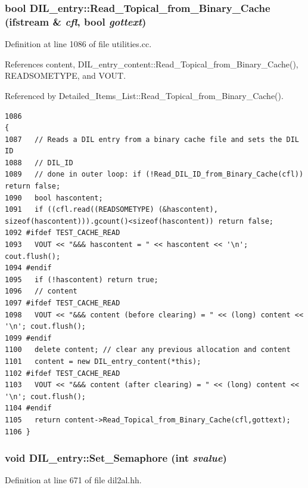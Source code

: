 \subsubsection{\setlength{\rightskip}{0pt plus 5cm}bool DIL\_\-entry::Read\_\-Topical\_\-from\_\-Binary\_\-Cache (ifstream \& {\em cfl}, bool {\em gottext})}\label{classDIL__entry_a25}




Definition at line 1086 of file utilities.cc.

References content, DIL\_\-entry\_\-content::Read\_\-Topical\_\-from\_\-Binary\_\-Cache(), READSOMETYPE, and VOUT.

Referenced by Detailed\_\-Items\_\-List::Read\_\-Topical\_\-from\_\-Binary\_\-Cache().



\footnotesize\begin{verbatim}1086                                                                            {
1087   // Reads a DIL entry from a binary cache file and sets the DIL ID
1088   // DIL_ID
1089   // done in outer loop: if (!Read_DIL_ID_from_Binary_Cache(cfl)) return false;
1090   bool hascontent;
1091   if ((cfl.read((READSOMETYPE) (&hascontent), sizeof(hascontent))).gcount()<sizeof(hascontent)) return false;
1092 #ifdef TEST_CACHE_READ
1093   VOUT << "&&& hascontent = " << hascontent << '\n'; cout.flush();
1094 #endif
1095   if (!hascontent) return true;
1096   // content
1097 #ifdef TEST_CACHE_READ
1098   VOUT << "&&& content (before clearing) = " << (long) content << '\n'; cout.flush();
1099 #endif
1100   delete content; // clear any previous allocation and content
1101   content = new DIL_entry_content(*this);
1102 #ifdef TEST_CACHE_READ
1103   VOUT << "&&& content (after clearing) = " << (long) content << '\n'; cout.flush();
1104 #endif
1105   return content->Read_Topical_from_Binary_Cache(cfl,gottext);
1106 }
\end{verbatim}\normalsize 
{}
\subsubsection{\setlength{\rightskip}{0pt plus 5cm}void DIL\_\-entry::Set\_\-Semaphore (int {\em svalue})\hspace{0.3cm}{\tt  [inline]}}\label{classDIL__entry_a8}




Definition at line 671 of file dil2al.hh.

